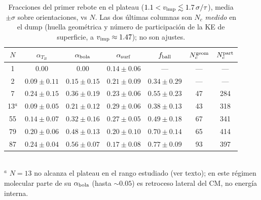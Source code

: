 \documentclass[10pt,a4paper,twocolumn]{article}
\begin{document}
\begin{table}[tp]
\centering
\small
\caption{Fracciones del primer rebote en el plateau
($1.1<v_{\rm imp}\lesssim1.7\,\sigma/\tau$), media $\pm\sigma$ sobre
orientaciones, vs $N$. Las dos últimas columnas son $N_c$ \emph{medido} en el
dump (huella geométrica y número de participación de la KE de superficie, a
$v_{\rm imp}\approx1.47$); no son ajustes.}
\label{tab:sweep_N}
\begin{tabular}{ccccccc}
\toprule
$N$ & $\alpha_{T_B}$ & $\alpha_{\rm bola}$ & $\alpha_{\rm surf}$ &
$f_{\rm ball}$ & $N_c^{\rm geom}$ & $N_c^{\rm part}$ \\
\midrule
 1  & $0.00$          & $0.00$          & $0.14\!\pm\!0.06$ & ---            & --- & --- \\
 2  & $0.09\!\pm\!0.11$ & $0.15\!\pm\!0.15$ & $0.21\!\pm\!0.09$ & $0.34\!\pm\!0.29$ & --- & --- \\
 7  & $0.24\!\pm\!0.15$ & $0.36\!\pm\!0.19$ & $0.23\!\pm\!0.06$ & $0.55\!\pm\!0.23$ & 47 & 284 \\
13$^a$ & $0.09\!\pm\!0.05$ & $0.21\!\pm\!0.12$ & $0.29\!\pm\!0.06$ & $0.38\!\pm\!0.13$ & 43 & 318 \\
55  & $0.14\!\pm\!0.07$ & $0.32\!\pm\!0.16$ & $0.27\!\pm\!0.05$ & $0.49\!\pm\!0.18$ & 67 & 341 \\
79  & $0.20\!\pm\!0.06$ & $0.48\!\pm\!0.13$ & $0.20\!\pm\!0.10$ & $0.70\!\pm\!0.14$ & 65 & 414 \\
87  & $0.24\!\pm\!0.04$ & $0.56\!\pm\!0.07$ & $0.17\!\pm\!0.08$ & $0.77\!\pm\!0.09$ & 93 & 397 \\
\bottomrule
\end{tabular}\\
\footnotesize $^a$ $N=13$ no alcanza el plateau en el rango estudiado
(ver texto); en este régimen molecular parte de su $\alpha_{\rm bola}$
(hasta $\sim0.05$) es retroceso lateral del CM, no energía interna.
\end{table}
\end{document}
